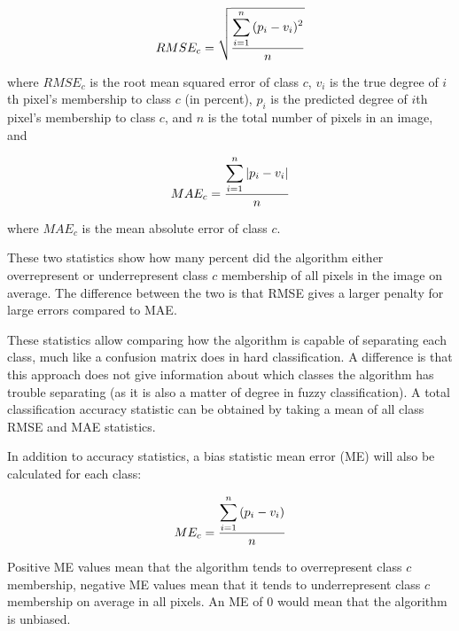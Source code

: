 \documentclass[a4paper,10pt]{book}
\begin{document}
$$ RMSE_c = \sqrt{ \displaystyle\sum_{i=1}^{n}{ (p_{i} - v_{i})^2 } \over{n} } $$

where $ RMSE_c $ is the root mean squared error of class $ c $, $ v_{i} $ is the true degree of $ i $th pixel's membership to class $ c $ (in percent), $ p_i $ is the predicted degree of $ i $th pixel's membership to class $ c $, and $ n $ is the total number of pixels in an image, and

$$ MAE_c = {\displaystyle\sum_{i=1}^{n}{ |p_{i} - v_{i}| } \over{n}} $$

where $ MAE_c $ is the mean absolute error of class $ c $.

These two statistics show how many percent did the algorithm either overrepresent or underrepresent class $ c $ membership of all pixels in the image on average. The difference between the two is that RMSE gives a larger penalty for large errors compared to MAE.

These statistics allow comparing how the algorithm is capable of separating each class, much like a confusion matrix does in hard classification. A difference is that this approach does not give information about which classes the algorithm has trouble separating (as it is also a matter of degree in fuzzy classification). A total classification accuracy statistic can be obtained by taking a mean of all class RMSE and MAE statistics.

In addition to accuracy statistics, a bias statistic mean error (ME) will also be calculated for each class:

$$ ME_c = {\displaystyle\sum_{i=1}^{n}{ (p_{i} - v_{i}) } \over{n}} $$

Positive ME values mean that the algorithm tends to overrepresent class $c$ membership, negative ME values mean that it tends to underrepresent class $c$ membership on average in all pixels. An ME of 0 would mean that the algorithm is unbiased.


\end{document}
